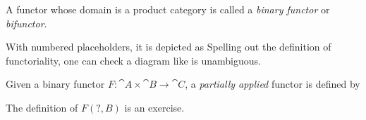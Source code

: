 \begin{definition}
A functor whose domain is a product category
is called a \emph{binary functor} or \emph{bifunctor}.
\end{definition}
With numbered placeholders, it is depicted as
Spelling out the definition of functoriality, one can check a diagram like
is unambiguous.

\begin{definition}
Given a binary functor $F : \cat{A} \times \cat{B} \to \cat{C}$, a \emph{partially applied} functor
is defined by
\end{definition}
The definition of $F(\texttt{?},B)$ is an exercise. 


